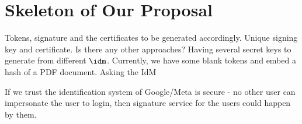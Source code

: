 \section{Skeleton of Our Proposal}

Tokens, signature and the certificates to be generated accordingly. Unique signing key and certificate. Is there any other approaches? Having several  secret keys to generate from different $\idm$. Currently, we have some blank tokens and embed a hash of a PDF document. Asking the IdM

If we trust the identification system of Google/Meta is secure - no other user can impersonate the user to login, then signature service for the users could happen by them.


